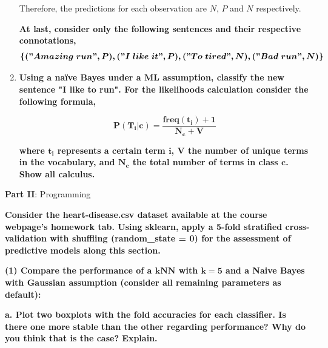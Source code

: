 \documentclass[12pt]{article}
\begin{document}
\begin{enumerate}[leftmargin=\labelsep]
    \vspace{10pt}
    Therefore, the predictions for each observation are $N$, $P$ and $N$ respectively.

    \vspace{10pt}

    \textbf{At last, consider only the following sentences and their respective connotations,}
    \[
    \boldsymbol{\{("Amazing\; run", P), ("I\; like\; it", P), ("To\; tired", N), ("Bad\; run", N)\}}
    \]

    \item \textbf{Using a naïve Bayes under a ML assumption, classify the new sentence
    "I like to run". For the likelihoods calculation consider the following formula,}

    \begin{equation*}
        \boldsymbol{P(T_i|c) = \frac{freq(t_i) + 1}{N_c + V}}
    \end{equation*}

    \textbf{where $\mathbf{t_i}$ represents a certain term $\mathbf{i}$, $\mathbf{V}$ the number of unique terms in the vocabulary, and
    $\mathbf{N_c}$ the total number of terms in class $\mathbf{c}$. Show all calculus.}

    
\end{enumerate}

\vspace{10pt}

\large{\textbf{Part II}: Programming}\normalsize

\vspace{20pt}
\textbf{Consider the heart-disease.csv dataset available at the course webpage's homework tab. Using sklearn, apply a 5-fold stratified cross-validation with shuffling (random\_state = 0) for the assessment of predictive models along this section.}

\vspace{10pt}
\textbf{(1) Compare the performance of a $\mathbf{kNN}$ with $\mathbf{k=5}$ and a Naive Bayes with Gaussian assumption (consider all remaining parameters as default):}

\vspace{10pt}
\textbf{a. Plot two boxplots with the fold accuracies for each classiﬁer. Is there one
more stable than the other regarding performance? Why do you think that is the
case? Explain.}

\vspace{20pt}

\end{document}
